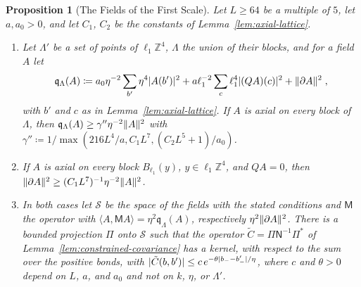 \documentclass[11pt]{preprint}
\DeclarePairedDelimiter{\abs}{\lvert}{\rvert}
\DeclarePairedDelimiter{\norm}{\lVert}{\rVert}
\numberwithin{equation}{section}
\newtheorem{proposition}[theorem]{Proposition}
\theoremstyle{definition}
\theoremstyle{remark}
\theoremstyle{plain}
\begin{document}
\begin{proposition}[The Fields of the First Scale]\label{prop:first-scale-fields}
Let $L \geq 64$ be a multiple of $5$, let $a, a_0 > 0$, and let $C_1$, $C_2$ be the constants of Lemma~\ref{lem:axial-lattice}.
\begin{enumerate}[label=(\roman*)]
\item Let $\Lambda'$ be a set of points of $\ell_1\mathbb Z^4$, $\Lambda$ the union of their blocks, and for a field $A$ let
\begin{equation}\label{eq:first-scale-form}
    \mathfrak q_\Lambda(A) \coloneqq a_0\eta^{-2}\sum_{b'}\eta^4\abs{A(b')}^2 + a\ell_1^{-2}\sum_c\ell_1^4\abs{(QA)(c)}^2 + \norm{\partial A}^2\;,
\end{equation}
with $b'$ and $c$ as in Lemma~\ref{lem:axial-lattice}. If $A$ is axial on every block of $\Lambda$, then $\mathfrak q_\Lambda(A) \geq \gamma''\eta^{-2}\norm A^2$ with $\gamma'' \coloneqq 1/\max(216L^4/a, C_1L^7, (C_2L^5 + 1)/a_0)$.
\item If $A$ is axial on every block $B_{\ell_1}(y)$, $y \in \ell_1\mathbb Z^4$, and $QA = 0$, then $\norm{\partial A}^2 \geq (C_1L^7)^{-1}\eta^{-2}\norm A^2$.
\item In both cases let $\mathcal S$ be the space of the fields with the stated conditions and $\mathsf M$ the operator with $\langle A, \mathsf MA\rangle = \eta^2\mathfrak q_\Lambda(A)$, respectively $\eta^2\norm{\partial A}^2$. There is a bounded projection $\Pi$ onto $\mathcal S$ such that the operator $\tilde C = \Pi\mathsf N^{-1}\Pi^*$ of Lemma~\ref{lem:constrained-covariance} has a kernel, with respect to the sum over the positive bonds, with $\abs{\tilde C(b, b')} \leq c\,e^{-\theta\abs{b_- - b'_-}/\eta}$, where $c$ and $\theta > 0$ depend on $L$, $a$, and $a_0$ and not on $k$, $\eta$, or $\Lambda'$.
\end{enumerate}
\end{proposition}
\end{document}
